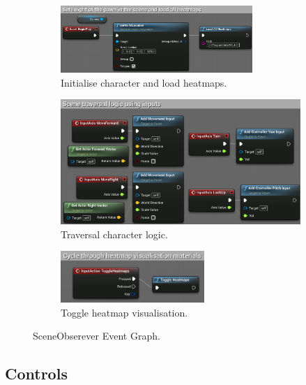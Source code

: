 \begin{figure}[!ht]\centering
    \begin{subfigure}[b]{\textwidth}
        \centering
        \includegraphics[width=0.8\textwidth]{img/initialise-character-pawn.png}
        \caption{Initialise character and load heatmaps.}
        \label{fig:load-heatmaps-character}
    \end{subfigure}
    \begin{subfigure}[b]{\textwidth}
        \centering
        \includegraphics[width=\textwidth]{img/character-traversal.png}
        \caption{Traversal character logic.}
    \end{subfigure}
    \begin{subfigure}[b]{\textwidth}
        \centering
        \includegraphics[width=0.6\textwidth]{img/toggle-heatmaps.png}
        \caption{Toggle heatmap visualisation.}
    \end{subfigure}
    \caption{SceneObserever Event Graph.}
    \label{fig:character-event-graph}
\end{figure}

\subsection{Controls}

